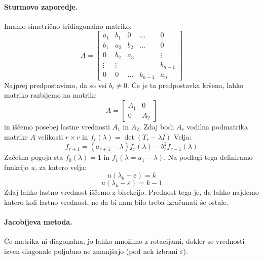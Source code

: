 \documentclass[a4paper]{article}
\begin{document}
\paragraph{Sturmovo zaporedje.} Imamo simetrično tridiagonalno matriko: $$A = \begin{bmatrix}
    a_1 & b_1 & 0 & \dots & 0 \\
    b_1 & a_2 & b_2 & \dots & 0 \\
    0 & b_2 & a_3 &  & \vdots \\
    \vdots & \vdots &  &  & b_{n-1} \\
    0 & 0 & \dots & b_{n-1} & a_n 
\end{bmatrix}$$
Najprej predpostavimo, da so vsi $b_i \neq 0$. Če je ta predpostavka kršena, lahko matriko razbijemo na matrike
$$A = \begin{bmatrix}
    A_1 & 0 \\
    0 & A_2
\end{bmatrix}$$ in iščemo posebej lastne vrednosti $A_1$ in $A_2$.
Zdaj bodi $A_r$ vodilna podmatrika matrike $A$ velikosti $r \times r$ in $f_r(\lambda) = \det(T_r - \lambda I)$
Velja:
$$f_{r+1} = (a_{r+1} - \lambda)f_{r}(\lambda) - b^2_rf_{r-1}(\lambda)$$
Začetna pogoja sta $f_0(\lambda) = 1$ in $f_1(\lambda = a_1 - \lambda)$.
Na podlagi tega definiramo funkcijo $u$, za katero velja:
$$u(\lambda_k + \varepsilon) = k$$
$$u(\lambda_k - \varepsilon) = k-1$$
Zdaj lahko lastno vrednost iščemo z bisekcijo. Prednost tega je, da lahko najdemo katero koli lastno vrednost, ne da bi nam bilo treba izračunati še ostale.
\paragraph{Jacobijeva metoda.} Če matrika ni diagonalna, jo lahko množimo z rotacijami, dokler se vrednosti izven diagonale poljubno ne zmanjšajo (pod nek izbrani $\varepsilon$).
\end{document}
